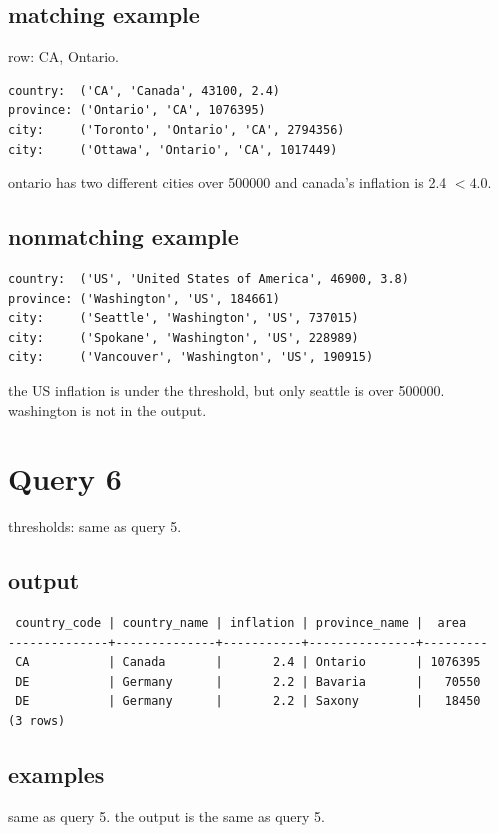 \documentclass[11pt]{article}
\begin{document}
\subsection*{matching example}
row: CA, Ontario.
\begin{verbatim}
country:  ('CA', 'Canada', 43100, 2.4)
province: ('Ontario', 'CA', 1076395)
city:     ('Toronto', 'Ontario', 'CA', 2794356)
city:     ('Ottawa', 'Ontario', 'CA', 1017449)
\end{verbatim}
ontario has two different cities over 500000 and canada's inflation is 2.4 $< 4.0$.

\subsection*{nonmatching example}
\begin{verbatim}
country:  ('US', 'United States of America', 46900, 3.8)
province: ('Washington', 'US', 184661)
city:     ('Seattle', 'Washington', 'US', 737015)
city:     ('Spokane', 'Washington', 'US', 228989)
city:     ('Vancouver', 'Washington', 'US', 190915)
\end{verbatim}
the US inflation is under the threshold, but only seattle is over 500000. washington is not in the output.

\section*{Query 6}

thresholds: same as query 5.

\subsection*{output}
{\small
\begin{verbatim}
 country_code | country_name | inflation | province_name |  area
--------------+--------------+-----------+---------------+---------
 CA           | Canada       |       2.4 | Ontario       | 1076395
 DE           | Germany      |       2.2 | Bavaria       |   70550
 DE           | Germany      |       2.2 | Saxony        |   18450
(3 rows)
\end{verbatim}
}

\subsection*{examples}
same as query 5. the output is the same as query 5.
\end{document}
